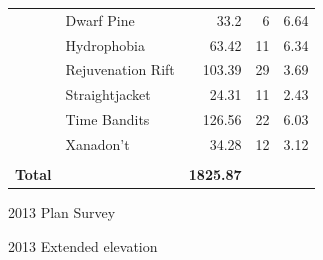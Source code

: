 {\begin{tabular}{lrrrr}
          & \multicolumn{1}{l}{Dwarf Pine} & 33.2  & 6     & 6.64 \\
          & \multicolumn{1}{l}{Hydrophobia} & 63.42 & 11    & 6.34 \\
          & \multicolumn{1}{l}{Rejuvenation Rift} & 103.39 & 29    & 3.69 \\
          & \multicolumn{1}{l}{Straightjacket} & 24.31 & 11    & 2.43 \\
          & \multicolumn{1}{l}{Time Bandits} & 126.56 & 22    & 6.03 \\
          & \multicolumn{1}{l}{Xanadon't} & 34.28 & 12    & 3.12 \\ \midrule
          &       &       &       &  \\
    \textbf{Total} &       & \textbf{1825.87} &       &  \\
    \end{tabular}%
}

\begin{pagesurvey}
\centering
{}
\caption[2013 Plan Survey]{2013 Plan Survey}
\label{plan 2013}
\end{pagesurvey}

\begin{pagesurvey}
\centering
{}
\caption[2013 Extended Elevation]{2013 Extended elevation}
\label{EE 2013}
\end{pagesurvey}
